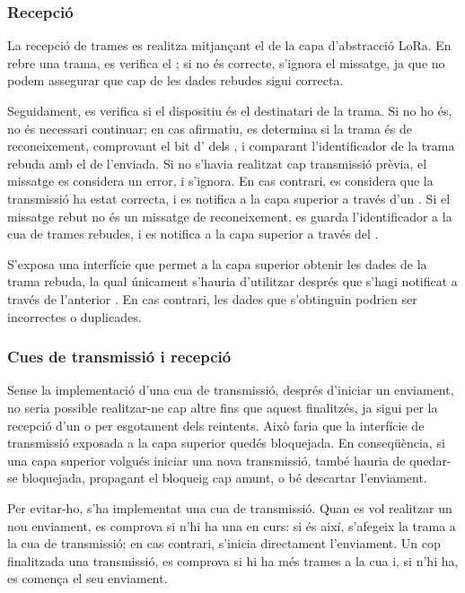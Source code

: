 \documentclass{tfgitic}[2024/07/01]
\begin{document}
\subsubsection{Recepció}
La recepció de trames es realitza mitjançant el  de la capa d'abstracció LoRa. En rebre una trama, es verifica el ; si no és correcte, s'ignora el missatge, ja que no podem assegurar que cap de les dades rebudes sigui correcta.

Seguidament, es verifica si el dispositiu és el destinatari de la trama. Si no ho és, no és necessari continuar; en cas afirmatiu, es determina si la trama és de reconeixement, comprovant el bit d' dels , i comparant l'identificador de la trama rebuda amb el de l'enviada. Si no s'havia realitzat cap transmissió prèvia, el missatge es considera un error, i s'ignora. En cas contrari, es considera que la transmissió ha estat correcta, i es notifica a la capa superior a través d'un . Si el missatge rebut no és un missatge de reconeixement, es guarda l'identificador a la cua de trames rebudes, i es notifica a la capa superior a través del .

S'exposa una interfície que permet a la capa superior obtenir les dades de la trama rebuda, la qual únicament s'hauria d'utilitzar després que s'hagi notificat a través de l'anterior . En cas contrari, les dades que s'obtinguin podrien ser incorrectes o duplicades.
\subsubsection{Cues de transmissió i recepció}
Sense la implementació d'una cua de transmissió, després d'iniciar un enviament, no seria possible realitzar-ne cap altre fins que aquest finalitzés, ja sigui per la recepció d'un  o per esgotament dels reintents. Això faria que la interfície de transmissió exposada a la capa superior quedés bloquejada. En conseqüència, si una capa superior volgués iniciar una nova transmissió, també hauria de quedar-se bloquejada, propagant el bloqueig cap amunt, o bé descartar l'enviament.

Per evitar-ho, s'ha implementat una cua de transmissió. Quan es vol realitzar un nou enviament, es comprova si n'hi ha una en curs: si és així, s'afegeix la trama a la cua de transmissió; en cas contrari, s'inicia directament l'enviament. Un cop finalitzada una transmissió, es comprova si hi ha més trames a la cua i, si n'hi ha, es comença el seu enviament.
\end{document}
